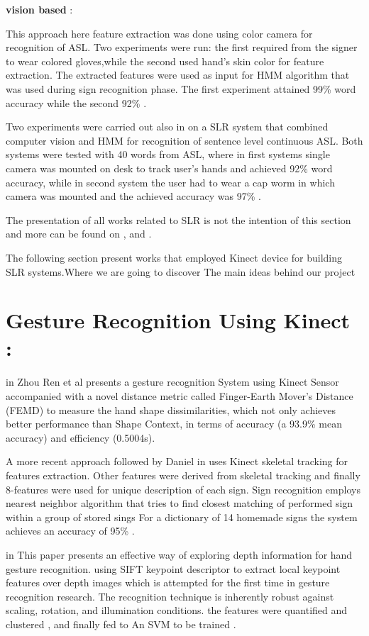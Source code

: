 \textbf{vision based }:

This approach  \cite{32} here  feature extraction was done using color camera for recognition of ASL. Two experiments were run: the first required from the signer to wear colored gloves,while the second used hand’s skin color for feature extraction\cite{32}. The extracted features were used as input for HMM algorithm that was used during sign recognition phase. The first experiment attained 99\% word accuracy while the second 92\%  .
 
Two experiments were carried out also in \cite{33} on a SLR system that combined computer vision and HMM for recognition of sentence level continuous ASL. Both systems were tested with 40 words from ASL, where in first systems single camera was mounted on desk to track user’s hands and achieved 92\% word accuracy, while in second system the user had to wear a cap worm in which camera was mounted and the achieved accuracy was 97\%  \cite{33}.



The presentation of all works related to SLR is not the intention of this section and more can be found on  \cite{27},\cite{36} and \cite{39}. 

The following section present works that employed Kinect device for building SLR systems.Where we are going to discover The main ideas behind our project 

\section{Gesture Recognition Using Kinect :}

in \cite{35} Zhou Ren et al presents a gesture recognition System using Kinect Sensor accompanied with a novel distance metric called Finger-Earth Mover’s Distance (FEMD) to measure the hand shape dissimilarities, which not only achieves better performance than Shape Context, in terms of accuracy (a 93.9\% mean accuracy) and efficiency (0.5004s). 

A more recent approach followed by Daniel in \cite{47} uses Kinect skeletal tracking for features extraction. Other features were derived from skeletal tracking and finally 8-features were used for unique description of each sign. Sign recognition employs nearest neighbor algorithm that tries to find closest matching of performed sign within a group of stored sings  For a dictionary of 14 homemade signs the system achieves an accuracy of 95\% \cite{47} . 

in \cite{dardas} This paper presents an effective way of exploring depth information for hand gesture recognition. using  SIFT keypoint descriptor to extract local keypoint features over depth images which is attempted for the first time in gesture recognition research. The recognition technique is inherently robust against scaling, rotation, and illumination conditions.  the features were  quantified  and clustered , and finally fed to  An SVM to be trained .\\


